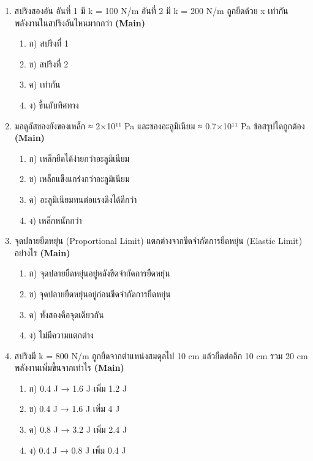 \documentclass[12pt]{article}
\begin{document}
\begin{enumerate}[label=\arabic*.]
\begin{enumerate}[label=)]
\item ก) 0.001
\item ข) 0.0001
\item ค) 0.01
\item ง) 0.00001
\end{enumerate}
\item สปริงสองอัน อันที่ 1 มี k = 100 N/m อันที่ 2 มี k = 200 N/m ถูกยืดด้วย x เท่ากัน พลังงานในสปริงอันไหนมากกว่า \hfill \textbf{\small (Main)}
\begin{enumerate}[label=)]
\item ก) สปริงที่ 1
\item ข) สปริงที่ 2
\item ค) เท่ากัน
\item ง) ขึ้นกับทิศทาง
\end{enumerate}
\item มอดูลัสของยังของเหล็ก ≈ 2×10¹¹ Pa และของอะลูมิเนียม ≈ 0.7×10¹¹ Pa ข้อสรุปใดถูกต้อง \hfill \textbf{\small (Main)}
\begin{enumerate}[label=)]
\item ก) เหล็กยืดได้ง่ายกว่าอะลูมิเนียม
\item ข) เหล็กแข็งแกร่งกว่าอะลูมิเนียม
\item ค) อะลูมิเนียมทนต่อแรงดึงได้ดีกว่า
\item ง) เหล็กหนักกว่า
\end{enumerate}
\item จุดปลายยืดหยุ่น (Proportional Limit) แตกต่างจากขีดจำกัดการยืดหยุ่น (Elastic Limit) อย่างไร \hfill \textbf{\small (Main)}
\begin{enumerate}[label=)]
\item ก) จุดปลายยืดหยุ่นอยู่หลังขีดจำกัดการยืดหยุ่น
\item ข) จุดปลายยืดหยุ่นอยู่ก่อนขีดจำกัดการยืดหยุ่น
\item ค) ทั้งสองคือจุดเดียวกัน
\item ง) ไม่มีความแตกต่าง
\end{enumerate}
\item สปริงมี k = 800 N/m ถูกยืดจากตำแหน่งสมดุลไป 10 cm แล้วยืดต่ออีก 10 cm รวม 20 cm พลังงานเพิ่มขึ้นจากเท่าไร \hfill \textbf{\small (Main)}
\begin{enumerate}[label=)]
\item ก) 0.4 J → 1.6 J เพิ่ม 1.2 J
\item ข) 0.4 J → 1.6 J เพิ่ม 4 J
\item ค) 0.8 J → 3.2 J เพิ่ม 2.4 J
\item ง) 0.4 J → 0.8 J เพิ่ม 0.4 J

\end{enumerate}
\end{enumerate}
\end{document}
